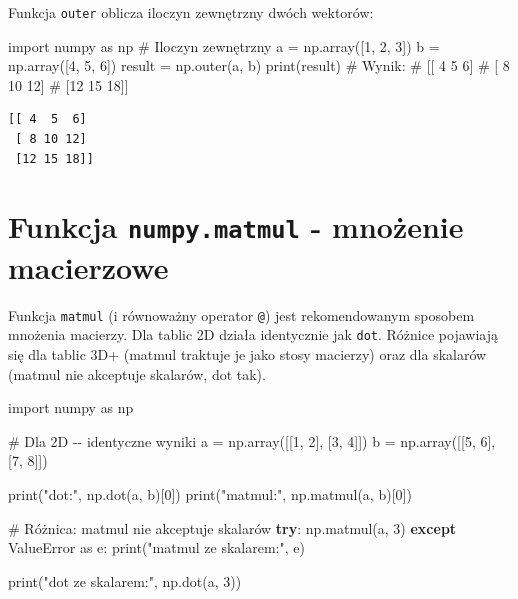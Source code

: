 \documentclass[
  polish,
  letterpaper,
  DIV=11,
  numbers=noendperiod]{scrreprt}
\newenvironment{Shaded}{\begin{snugshade}}{\end{snugshade}}
\newcommand{\BuiltInTok}[1]{\textcolor[rgb]{0.00,0.23,0.31}{#1}}
\newcommand{\CommentTok}[1]{\textcolor[rgb]{0.37,0.37,0.37}{#1}}
\newcommand{\ControlFlowTok}[1]{\textcolor[rgb]{0.00,0.23,0.31}{\textbf{#1}}}
\newcommand{\DecValTok}[1]{\textcolor[rgb]{0.68,0.00,0.00}{#1}}
\newcommand{\ImportTok}[1]{\textcolor[rgb]{0.00,0.46,0.62}{#1}}
\newcommand{\NormalTok}[1]{\textcolor[rgb]{0.00,0.23,0.31}{#1}}
\newcommand{\OperatorTok}[1]{\textcolor[rgb]{0.37,0.37,0.37}{#1}}
\newcommand{\PreprocessorTok}[1]{\textcolor[rgb]{0.68,0.00,0.00}{#1}}
\newcommand{\StringTok}[1]{\textcolor[rgb]{0.13,0.47,0.30}{#1}}
\begin{document}
Funkcja \texttt{outer} oblicza iloczyn zewnętrzny dwóch wektorów:

\begin{Shaded}
\begin{Highlighting}[]
\ImportTok{import}\NormalTok{ numpy }\ImportTok{as}\NormalTok{ np}
\CommentTok{\# Iloczyn zewnętrzny}
\NormalTok{a }\OperatorTok{=}\NormalTok{ np.array([}\DecValTok{1}\NormalTok{, }\DecValTok{2}\NormalTok{, }\DecValTok{3}\NormalTok{])}
\NormalTok{b }\OperatorTok{=}\NormalTok{ np.array([}\DecValTok{4}\NormalTok{, }\DecValTok{5}\NormalTok{, }\DecValTok{6}\NormalTok{])}
\NormalTok{result }\OperatorTok{=}\NormalTok{ np.outer(a, b)}
\BuiltInTok{print}\NormalTok{(result)}
\CommentTok{\# Wynik:}
\CommentTok{\# [[ 4  5  6]}
\CommentTok{\#  [ 8 10 12]}
\CommentTok{\#  [12 15 18]]}
\end{Highlighting}
\end{Shaded}

\begin{verbatim}
[[ 4  5  6]
 [ 8 10 12]
 [12 15 18]]
\end{verbatim}

\section{\texorpdfstring{Funkcja \texttt{numpy.matmul} - mnożenie
macierzowe}{Funkcja numpy.matmul - mnożenie macierzowe}}\label{funkcja-numpy.matmul---mnoux17cenie-macierzowe}

Funkcja \texttt{matmul} (i równoważny operator \texttt{@}) jest
rekomendowanym sposobem mnożenia macierzy. Dla tablic 2D działa
identycznie jak \texttt{dot}. Różnice pojawiają się dla tablic 3D+
(matmul traktuje je jako stosy macierzy) oraz dla skalarów (matmul nie
akceptuje skalarów, dot tak).

\begin{Shaded}
\begin{Highlighting}[]
\ImportTok{import}\NormalTok{ numpy }\ImportTok{as}\NormalTok{ np}

\CommentTok{\# Dla 2D {-}{-} identyczne wyniki}
\NormalTok{a }\OperatorTok{=}\NormalTok{ np.array([[}\DecValTok{1}\NormalTok{, }\DecValTok{2}\NormalTok{], [}\DecValTok{3}\NormalTok{, }\DecValTok{4}\NormalTok{]])}
\NormalTok{b }\OperatorTok{=}\NormalTok{ np.array([[}\DecValTok{5}\NormalTok{, }\DecValTok{6}\NormalTok{], [}\DecValTok{7}\NormalTok{, }\DecValTok{8}\NormalTok{]])}

\BuiltInTok{print}\NormalTok{(}\StringTok{"dot:"}\NormalTok{, np.dot(a, b)[}\DecValTok{0}\NormalTok{])}
\BuiltInTok{print}\NormalTok{(}\StringTok{"matmul:"}\NormalTok{, np.matmul(a, b)[}\DecValTok{0}\NormalTok{])}

\CommentTok{\# Różnica: matmul nie akceptuje skalarów}
\ControlFlowTok{try}\NormalTok{:}
\NormalTok{    np.matmul(a, }\DecValTok{3}\NormalTok{)}
\ControlFlowTok{except} \PreprocessorTok{ValueError} \ImportTok{as}\NormalTok{ e:}
    \BuiltInTok{print}\NormalTok{(}\StringTok{"matmul ze skalarem:"}\NormalTok{, e)}

\BuiltInTok{print}\NormalTok{(}\StringTok{"dot ze skalarem:"}\NormalTok{, np.dot(a, }\DecValTok{3}\NormalTok{))}
\end{Highlighting}
\end{Shaded}
\end{document}

